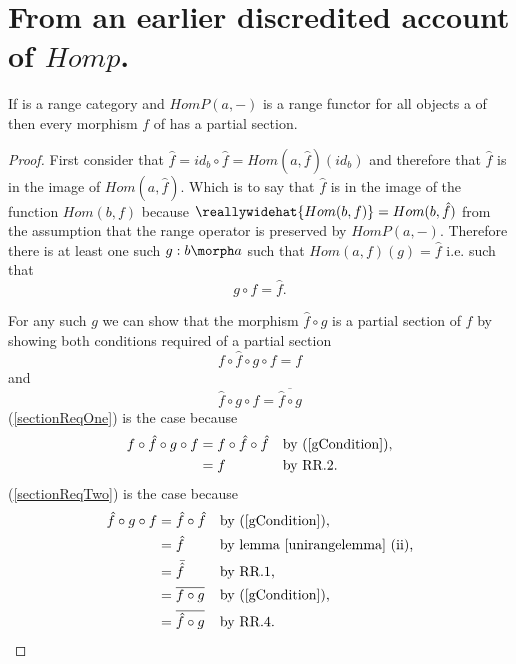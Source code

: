 \section{From an earlier discredited account of $Homp$.}
\begin{lemma}
If \catcw is a range category and $HomP(a,-)$ is a range functor for all objects a of \catcw
then every morphism $f$ of \catcw has a partial section. 
\end{lemma}
\begin{proof} 
First consider that 
$\widehat{f}=id_b \circ \hat{f}=Hom(a,\hat{f})(id_b)$ 
and therefore that $\widehat{f}$ is in the image of $Hom(a,\hat{f})$.
Which is to say that $\widehat{f}$  is in the image of the function
$Hom(b,f)$ because $\reallywidehat{Hom(b,f)} = Hom(b,\hat{f})$ from the assumption that the range operator is preserved by $HomP(a,-)$. Therefore there is
at least one such $g: b \morph a$ such that $Hom(a,f)(g) = \hat{f}$ i.e. such
that
\begin{equation}
\label{gCondition}
g \circ f = \hat{f}.
\end{equation}

For any such $g$ we can show that the morphism $\hat{f} \circ g$ is a partial section of $f$
by showing  both conditions required of a partial section 
\begin{equation}
\label{sectionReqOne}
f \circ \hat{f} \circ g \circ f = f
\end{equation}  
and
\begin{equation}
\label{sectionReqTwo}
\hat{f} \circ g \circ f = \overline{\hat{f} \circ g}
\end{equation}
(\ref{sectionReqOne}) is the case because
\begin{align*}
f \circ \hat{f} \circ g \circ f &=  f \circ \hat{f} \circ \hat{f}     
                                               && \mbox{by (\ref{gCondition}),} \\
                                &=f       
                                               && \mbox{by RR.2.} 
\end{align*}
(\ref{sectionReqTwo}) is the case because
\begin{align*}
\hat{f} \circ g \circ f  &= \hat{f} \circ \hat{f}       
                                               && \mbox{by (\ref{gCondition}),} \\
                         &= \hat{f}     
                                               && \mbox{by lemma \ref{unirangelemma} (ii),} \\
                         &= \bar{\hat{f}}     
                                               && \mbox{by RR.1,} \\
                         &= \overline{f \circ g}    
                                               && \mbox{by (\ref{gCondition}),}\\
                         &= \overline{\hat{f} \circ g}     
                                               && \mbox{by RR.4.} \\
\end{align*}
\end{proof}

